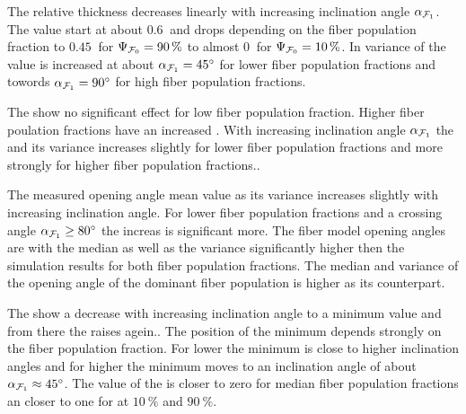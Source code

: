 \par
The relative thickness \trel{} decreases linearly with increasing inclination angle $\textnormal{$\alpha$}_{\textnormal{$\mathcal{F}_1$}}$.
The \trel{} value start at about $\SI{0.6}{}$ and drops depending on the fiber population fraction \modelPsi{} to $\SI{0.45}{}$ for $\textnormal{$\Psi_{\textnormal{$\mathcal{F}_0$}}$}=\SI{90}{\percent}$ to almost $\SI{0}{}$ for $\textnormal{$\Psi_{\textnormal{$\mathcal{F}_0$}}$}=\SI{10}{\percent}$.
In variance of the \trel{} value is increased at about $\textnormal{$\alpha$}_{\textnormal{$\mathcal{F}_1$}}=\SI{45}{\degree}$ for lower fiber population fractions and towords $\textnormal{$\alpha$}_{\textnormal{$\mathcal{F}_1$}}=\SI{90}{\degree}$ for high fiber population fractions.
\par
The \rvalue{} show no significant effect for low fiber population fraction. 
Higher fiber poulation fractions have an increased \rvalue{}.
With increasing inclination angle $\textnormal{$\alpha$}_{\textnormal{$\mathcal{F}_1$}}$ the \rvalue{} and its variance increases slightly for lower fiber population fractions and more strongly for higher fiber population fractions..
\par
The measured opening angle \openingAngle{} mean value as its variance increases slightly with increasing inclination angle.
For lower fiber population fractions and a crossing angle $\textnormal{$\alpha$}_{\textnormal{$\mathcal{F}_1$}} \geq \SI{80}{\degree}$ the increas is significant more.
The fiber model opening angles are with the median as well as the \bvariance{} variance significantly higher then the simulation results for both fiber population fractions.
The median and \bvariance{} variance of the opening angle of the dominant fiber population is higher as its counterpart.
\par
The \accvalue{} show a decrease with increasing inclination angle to a minimum value and from there the \accvalue{} raises agein..
The position of the minimum depends strongly on the fiber population fraction.
For lower \modelPsi{} the minimum is close to higher inclination angles and for higher \modelPsi{} the minimum moves to an inclination angle of about $\textnormal{$\alpha$}_{\textnormal{$\mathcal{F}_1$}} \approx \SI{45}{\degree}$.
The value of the \accvalue is closer to zero for median fiber population fractions an closer to one for \modelPsi{} at $\SI{10}{\percent}$ and $\SI{90}{\percent}$.
%
% 
% 
